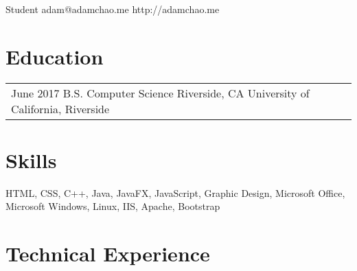 \documentclass[print]{friggeri-cv} %
\makeatletter
\renewenvironment{entrylist}{%
	\par\begin{tabular*}{\textwidth}{@{\extracolsep{\fill}}ll}
	}{%
\end{tabular*}\par
}
\makeatother
\begin{document}
{Student} %
{adam@adamchao.me}
{http://adamchao.me}

\hfill

\section{Education}
\begin{entrylist}
\entry
	{June 2017}
	{B.S. Computer Science}
	{Riverside, CA}
	{University of California, Riverside}
\end{entrylist}


\section{Skills}
HTML, CSS, C++, Java, JavaFX, JavaScript, Graphic Design, Microsoft Office, Microsoft Windows, Linux, IIS, Apache, Bootstrap


\section{Technical Experience}
\end{document}
